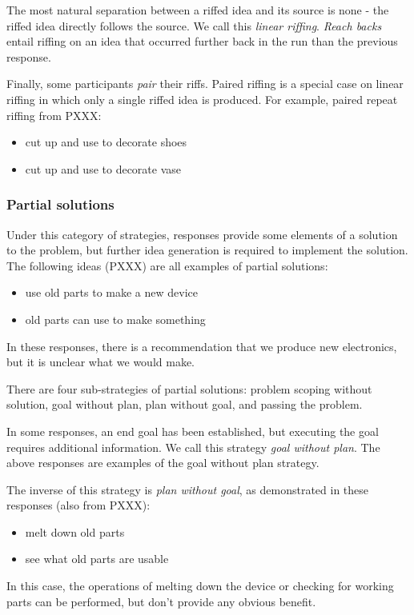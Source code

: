The most natural separation between a riffed idea and its source is none - the riffed idea directly follows the source. We call this \emph{linear riffing}.
\emph{Reach backs} entail riffing on an idea that occurred further back in the run than the previous response. 

Finally, some participants \emph{pair} their riffs. Paired riffing is a special case on linear riffing in which only a single riffed idea is produced. For example, paired repeat riffing from PXXX:

\begin{itemize}
\item cut up and use to decorate shoes
\item cut up and use to decorate vase
\end{itemize}


\subsubsection{Partial solutions}

Under this category of strategies, responses provide some elements of a solution to the problem, but further idea generation is required to implement the solution. The following ideas (PXXX) are all examples of partial solutions:

\begin{itemize}
    \item use old parts to make a new device
    \item old parts can use to make something
\end{itemize}

In these responses, there is a recommendation that we produce new electronics, but it is unclear what we would make. 

There are four sub-strategies of partial solutions: problem scoping without solution, goal without plan, plan without goal, and passing the problem. 

In some responses, an end goal has been established, but executing the goal requires additional information. We call this strategy \emph{goal without plan}. The above responses are examples of the goal without plan strategy.

The inverse of this strategy is \emph{plan without goal}, as demonstrated in these responses (also from PXXX):
\begin{itemize}
    \item melt down old parts
    \item see what old parts are usable
\end{itemize}
In this case, the operations of melting down the device or checking for working parts can be performed, but don't provide any obvious benefit.

